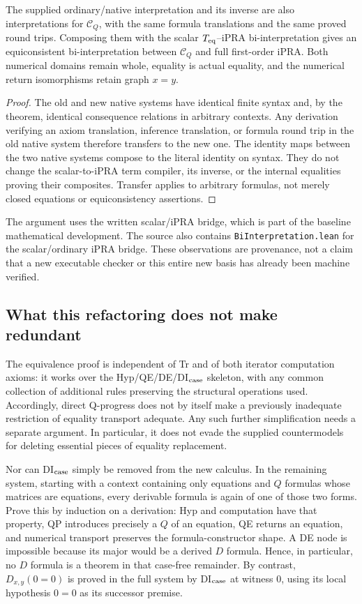 \begin{corollary}
The supplied ordinary/native interpretation and its inverse are also
interpretations for $\mathcal C_Q$, with the same formula translations
and the same proved round trips.  Composing them with the scalar
$T_{\rm eq}$--iPRA bi-interpretation gives an equiconsistent
bi-interpretation between $\mathcal C_Q$ and full first-order iPRA.
Both numerical domains remain whole, equality is actual equality, and
the numerical return isomorphisms retain graph $x=y$.
\end{corollary}
\begin{proof}
The old and new native systems have identical finite syntax and, by the
theorem, identical consequence relations in arbitrary contexts.  Any
derivation verifying an axiom translation, inference translation, or
formula round trip in the old native system therefore transfers to the
new one.  The identity maps between the two native systems compose to
the literal identity on syntax.  They do not change the scalar-to-iPRA
term compiler, its inverse, or the internal equalities proving their
composites.  Transfer applies to arbitrary formulas, not merely closed
equations or equiconsistency assertions.
\end{proof}
The argument uses the written scalar/iPRA bridge, which is part of the
baseline mathematical development.  The source also contains
\texttt{BiInterpretation.lean} for the scalar/ordinary iPRA bridge.
These observations are provenance, not a claim that a new executable
checker or this entire new basis has already been machine verified.

\subsection{What this refactoring does not make redundant}

The equivalence proof is independent of Tr and of both iterator
computation axioms: it works over the Hyp/QE/DE/DI$_{\rm case}$ skeleton,
with any common collection of additional rules preserving the structural
operations used.  Accordingly, direct Q-progress does not by itself
make a previously inadequate restriction of equality transport adequate.
Any such further simplification needs a separate argument.  In
particular, it does not evade the supplied countermodels for deleting
essential pieces of equality replacement.

Nor can DI$_{\rm case}$ simply be removed from the new calculus.  In the
remaining system, starting with a context containing only equations and
$Q$ formulas whose matrices are equations, every derivable formula is
again of one of those two forms.  Prove this by induction on a derivation:
Hyp and computation have that property, QP introduces precisely a $Q$
of an equation, QE returns an equation, and numerical transport preserves
the formula-constructor shape.  A DE node is impossible because its
major would be a derived $D$ formula.  Hence, in particular, no $D$
formula is a theorem in that case-free remainder.  By contrast,
$D_{x,y}(0=0)$ is proved in the full system by DI$_{\rm case}$ at witness
$0$, using its local hypothesis $0=0$ as its successor premise.

